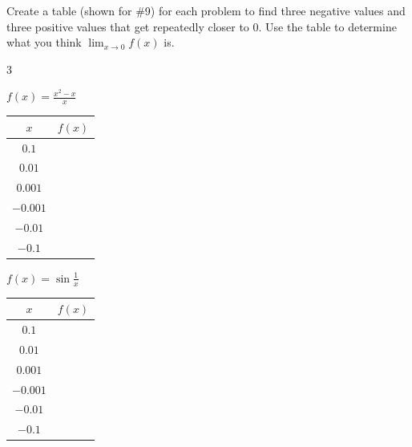 \documentclass[11pt]{article}
\begin{document}
\begin{enumerate}
        \noindent Create a table (shown for \#9) for each problem to find three negative values and three positive values that get repeatedly closer to 0. Use the table to determine what you think $\displaystyle \lim_{x\to0}f(x)$ is.

        \begin{multicols}{3}
            \item $\displaystyle f(x)=\frac{x^2-x}{x}$\\[1ex]
            {\renewcommand{\arraystretch}{1.4}
                \begin{tabular}{|c|p{1.8cm}|}
                    \hline
                    $\displaystyle x$      & \hfil $\displaystyle f(x)$ \\ \hline
                    $\displaystyle 0.1$    &                            \\ \hline
                    $\displaystyle 0.01$   &                            \\ \hline
                    $\displaystyle 0.001$  &                            \\ \hline
                    $\displaystyle -0.001$ &                            \\ \hline
                    $\displaystyle -0.01$  &                            \\ \hline
                    $\displaystyle -0.1$   &                            \\ \hline
                \end{tabular}}

            \item $\displaystyle f(x) = \sin{\frac{1}{x}}$\\[2ex]
            {\renewcommand{\arraystretch}{1.4}
                \begin{tabular}{|c|p{1.8cm}|}
                    \hline
                    $\displaystyle x$      & \hfil $\displaystyle f(x)$ \\ \hline
                    $\displaystyle 0.1$    &                            \\ \hline
                    $\displaystyle 0.01$   &                            \\ \hline
                    $\displaystyle 0.001$  &                            \\ \hline
                    $\displaystyle -0.001$ &                            \\ \hline
                    $\displaystyle -0.01$  &                            \\ \hline
                    $\displaystyle -0.1$   &                            \\ \hline
                \end{tabular}}


\end{multicols}
\end{enumerate}
\end{document}
